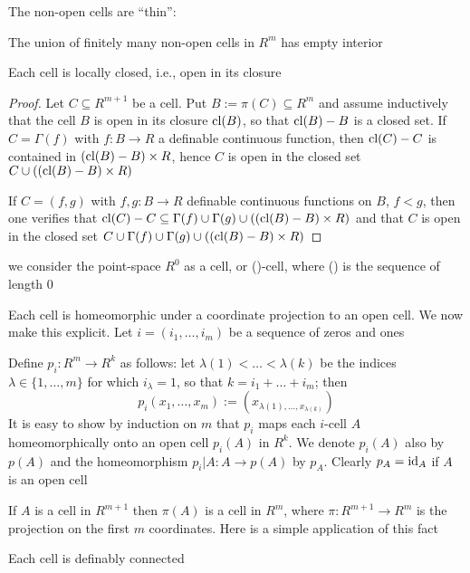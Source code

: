 \documentclass[11pt]{article}
\begin{document}
The non-open cells are ``thin'':

The union of finitely many non-open cells in \(R^m\) has empty interior

\begin{proposition}[]
Each cell is locally closed, i.e., open in its closure
\end{proposition}

\begin{proof}
Let \(C\subseteq R^{m+1}\) be a cell. Put \(B:=\pi(C)\subseteq R^m\) and assume inductively that the cell \(B\) is
open in its closure \(\operatorname{\text{cl}}(B)\), so that \(\operatorname{\text{cl}}(B)-B\) is a closed set. If \(C=\Gamma(f)\)
with \(f:B\to R\) a definable continuous function, then \(\operatorname{\text{cl}}(C)-C\) is contained
in \((\operatorname{\text{cl}}(B)-B)\times R\), hence \(C\) is open in the closed set \(C\cup((\operatorname{\text{cl}}(B)- B)\times R)\)  \label{Problem1}

If \(C=(f,g)\) with \(f,g:B\to R\) definable continuous functions on \(B\), \(f<g\), then one
verifies that \(\operatorname{\text{cl}}(C)-C\subseteq\Gamma(f)\cup\Gamma(g)\cup((\operatorname{\text{cl}}(B)-B)\times R)\) and that \(C\) is open in the closed set
\(C\cup\Gamma(f)\cup\Gamma(g)\cup((\operatorname{\text{cl}}(B)-B)\times R)\)
\end{proof}

we consider the point-space \(R^0\) as a cell, or ()-cell, where () is the sequence of length 0

Each cell is homeomorphic under a coordinate projection to an open cell. We now make this
explicit. Let \(i=(i_1,\dots,i_m)\) be a sequence of zeros and ones

Define \(p_i:R^m\to R^k\) as follows: let \(\lambda(1)<\dots<\lambda(k)\) be the indices \(\lambda\in\{1,\dots,m\}\) for
which \(i_\lambda=1\), so that \(k=i_1+\dots+i_m\); then
\begin{equation*}
p_i(x_1,\dots,x_m):=(x_{\lambda(1),\dots,x_{\lambda(k)}})
\end{equation*}
It is easy to show by induction on \(m\) that \(p_i\) maps each \(i\)-cell \(A\) homeomorphically
onto an open cell \(p_i(A)\) in \(R^k\). We denote \(p_i(A)\) also by \(p(A)\) and the
homeomorphism \(p_i|A:A\to p(A)\) by \(p_A\). Clearly \(p_A=\operatorname{id}_A\) if \(A\) is an open cell

If \(A\) is a cell in \(R^{m+1}\) then \(\pi(A)\) is a cell in \(R^m\), where \(\pi:R^{m+1}\to R^m\) is
the projection on the first \(m\) coordinates. Here is a simple application of this fact

\begin{proposition}[]
Each cell is definably connected
\end{proposition}
\end{document}
